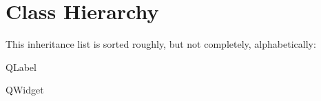 \section{Class Hierarchy}
This inheritance list is sorted roughly, but not completely, alphabetically\+:\begin{DoxyCompactList}
\item {}
\item Q\+Label\begin{DoxyCompactList}
\item {}
\end{DoxyCompactList}
\item Q\+Widget\begin{DoxyCompactList}
\item {}
\end{DoxyCompactList}
\end{DoxyCompactList}
